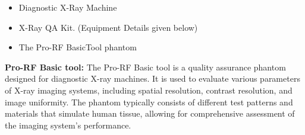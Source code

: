 \begin{itemize}
    \item Diagnostic X-Ray Machine
    \item X-Ray QA Kit. (Equipment Details given below)
    \item The Pro-RF BasicTool phantom
\end{itemize}

\textbf{Pro-RF Basic tool:} The Pro-RF Basic tool is a quality assurance phantom designed for diagnostic X-ray machines. It is used to evaluate various parameters of X-ray imaging systems, including spatial resolution, contrast resolution, and image uniformity. The phantom typically consists of different test patterns and materials that simulate human tissue, allowing for comprehensive assessment of the imaging system's performance.

